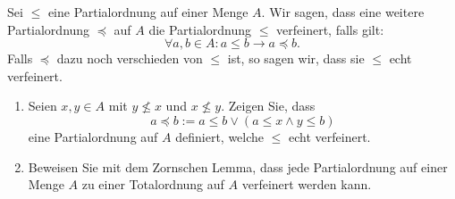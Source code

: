 \documentclass[12pt]{article}
\begin{document}
\begin{problem}[Aufgabe]{}{}
    Sei $\leqslant$ eine Partialordnung auf einer Menge $A$. Wir sagen, dass eine weitere Partialordnung $\preceq$ auf $A$ die Partialordnung $\leqslant$ verfeinert, falls gilt:
\[
\forall a, b \in A : a \leqslant b \longrightarrow a \preceq b.
\]
Falls $\preceq$ dazu noch verschieden von $\leqslant$ ist, so sagen wir, dass sie $\leqslant$ echt verfeinert.

\begin{enumerate}
    \item[(a)] Seien $x, y \in A$ mit $y \nleqslant x$ und $x \nleqslant y$. Zeigen Sie, dass
    \[
    a \preceq b := a \leqslant b \vee (a \leqslant x \wedge y \leqslant b)
    \]
    eine Partialordnung auf $A$ definiert, welche $\leqslant$ echt verfeinert.
    
    \item[(b)] Beweisen Sie mit dem Zornschen Lemma, dass jede Partialordnung auf einer Menge $A$ zu einer Totalordnung auf $A$ verfeinert werden kann.
\end{enumerate}
\end{problem}
\end{document}
